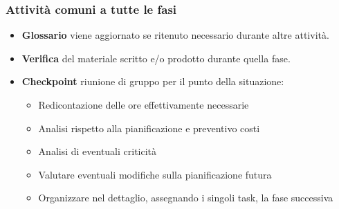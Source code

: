 \subsubsection{Attività comuni a tutte le fasi}
\begin{itemize}
    \item \textbf{Glossario} viene aggiornato se ritenuto necessario durante altre attività.
    \item \textbf{Verifica} del materiale scritto e/o prodotto durante quella fase.
    \item \textbf{Checkpoint} riunione di gruppo per il punto della situazione:
        \begin{itemize}
            \item Redicontazione delle ore effettivamente necessarie
            \item Analisi rispetto alla pianificazione e preventivo costi
            \item Analisi di eventuali criticità
            \item Valutare eventuali modifiche sulla pianificazione futura
            \item Organizzare nel dettaglio, assegnando i singoli task, la fase successiva 
        \end{itemize}
\end{itemize}